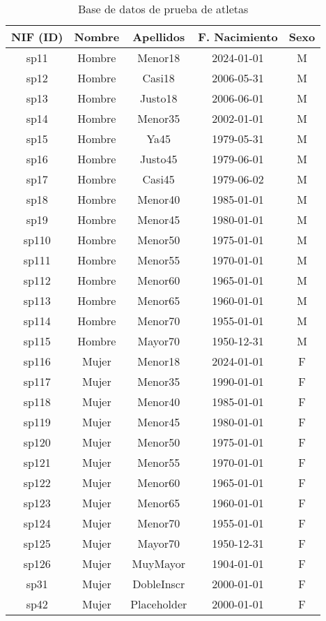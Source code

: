 \begin{table}[H]
	\centering
	\caption{Base de datos de prueba de atletas}
	\begin{tabular}{|c|c|c|c|c|}
		\hline
		 \textbf{NIF (ID)} & \textbf{Nombre} & \textbf{Apellidos} & \textbf{F. Nacimiento} & \textbf{Sexo} \\
		\hline
		\hline
		sp11 & Hombre & Menor18 & 2024-01-01 & M \\
		sp12 & Hombre & Casi18 & 2006-05-31 & M \\
		sp13 & Hombre & Justo18 & 2006-06-01 & M \\
		sp14 & Hombre & Menor35 & 2002-01-01 & M \\
		sp15 & Hombre & Ya45 & 1979-05-31 & M \\
		sp16 & Hombre & Justo45 & 1979-06-01 & M \\
		sp17 & Hombre & Casi45 & 1979-06-02 & M \\
		sp18 & Hombre & Menor40 & 1985-01-01 & M \\
		sp19 & Hombre & Menor45 & 1980-01-01 & M \\
		sp110 & Hombre & Menor50 & 1975-01-01 & M \\
		sp111 & Hombre & Menor55 & 1970-01-01 & M \\
		sp112 & Hombre & Menor60 & 1965-01-01 & M \\
		sp113 & Hombre & Menor65 & 1960-01-01 & M \\
		sp114 & Hombre & Menor70 & 1955-01-01 & M \\
		sp115 & Hombre & Mayor70 & 1950-12-31 & M \\
		sp116 & Mujer & Menor18 & 2024-01-01 & F \\
		sp117 & Mujer & Menor35 & 1990-01-01 & F \\
		sp118 & Mujer & Menor40 & 1985-01-01 & F \\
		sp119 & Mujer & Menor45 & 1980-01-01 & F \\
		sp120 & Mujer & Menor50 & 1975-01-01 & F \\
		sp121 & Mujer & Menor55 & 1970-01-01 & F \\
		sp122 & Mujer & Menor60 & 1965-01-01 & F \\
		sp123 & Mujer & Menor65 & 1960-01-01 & F \\
		sp124 & Mujer & Menor70 & 1955-01-01 & F \\
		sp125 & Mujer & Mayor70 & 1950-12-31 & F \\
		sp126 & Mujer & MuyMayor & 1904-01-01 & F \\
		sp31 & Mujer & DobleInscr & 2000-01-01 & F \\
		sp42 & Mujer & Placeholder & 2000-01-01 & F \\
		\hline
	\end{tabular}
\end{table}
